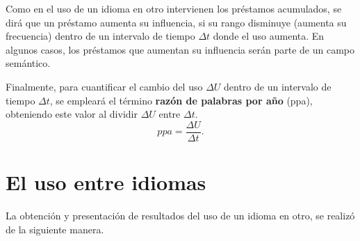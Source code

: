 Como en el uso de un idioma en otro intervienen los préstamos acumulados, se dirá que un préstamo aumenta su influencia, si su rango disminuye (aumenta su frecuencia) dentro de un intervalo de tiempo $\Delta t$ donde el uso aumenta. En algunos casos, los préstamos  que aumentan su influencia serán parte de un campo semántico.

Finalmente, para cuantificar el cambio del uso $\Delta U$ dentro de un  intervalo de tiempo $\Delta t$, se  empleará el término \textbf{razón de palabras por año}  (ppa), obteniendo este valor al dividir $\Delta U$ entre $\Delta t$. 
\begin{equation}
ppa = \frac{\Delta U}{\Delta t}.
\label{ec.razon}
\end{equation}	







\section {El uso entre idiomas}  %
La obtención y presentación de resultados del uso de un idioma en otro, se realizó de la siguiente manera.


